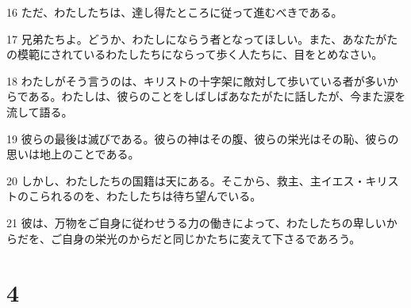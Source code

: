\par 16 ただ、わたしたちは、達し得たところに従って進むべきである。
\par 17 兄弟たちよ。どうか、わたしにならう者となってほしい。また、あなたがたの模範にされているわたしたちにならって歩く人たちに、目をとめなさい。
\par 18 わたしがそう言うのは、キリストの十字架に敵対して歩いている者が多いからである。わたしは、彼らのことをしばしばあなたがたに話したが、今また涙を流して語る。
\par 19 彼らの最後は滅びである。彼らの神はその腹、彼らの栄光はその恥、彼らの思いは地上のことである。
\par 20 しかし、わたしたちの国籍は天にある。そこから、救主、主イエス・キリストのこられるのを、わたしたちは待ち望んでいる。
\par 21 彼は、万物をご自身に従わせうる力の働きによって、わたしたちの卑しいからだを、ご自身の栄光のからだと同じかたちに変えて下さるであろう。

\chapter{4}

